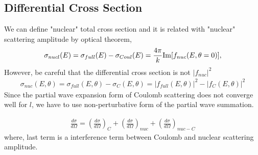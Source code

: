 \documentclass[10pt]{article}
\newcommand{\bea}{\begin{eqnarray}}
\newcommand{\eea}{\end{eqnarray}}
\begin{document}
\subsection{Differential Cross Section}

We can define "nuclear" total cross section and it is related with
"nuclear" scattering amplitude by optical theorem,
\bea
\sigma_{nucl}(E)=\sigma_{full}(E)-\sigma_{Coul}(E)
                =\frac{4\pi}{k}{\rm Im}[f_{nuc}(E,\theta=0)],
\eea
However, be careful that the differential cross section is not $|f_{nuc}|^2$
\bea
\sigma_{nuc}(E,\theta)=\sigma_{full}(E,\theta)-\sigma_{C}(E,\theta)
                      =|f_{full}(E,\theta)|^2-|f_{C}(E,\theta)|^2
\eea
Since the partial wave expansion form of Coulomb scattering does not 
converge well for $l$, we have to use non-perturbative form of the 
partial wave summation.

\bea
\frac{d\sigma}{d\Omega}=\left( \frac{d\sigma}{d\Omega}\right)_C
                             +\left( \frac{d\sigma}{d\Omega}\right)_{nuc}
                             +\left( \frac{d\sigma}{d\Omega}\right)_{nuc-C}  
\eea 
where, last term is a interference term between Coulomb and nuclear scattering amplitude.
\end{document}
